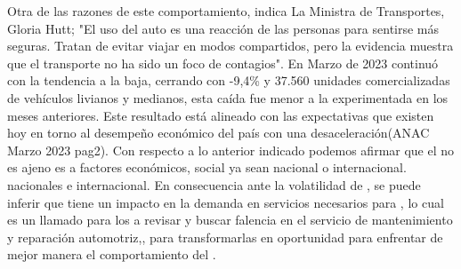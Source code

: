 \documentclass[a4papper,11pt]{article}
\begin{document}
      Otra de las razones de este comportamiento, indica La Ministra de Transportes, Gloria Hutt; "El uso del auto es una reacción de las personas para sentirse más seguras. Tratan de evitar viajar en modos compartidos, pero la evidencia muestra que el transporte no ha sido un foco de contagios".
      En Marzo de 2023 continuó con la tendencia a la baja, cerrando con -9,4\% y 37.560 unidades comercializadas de vehículos livianos y medianos, esta caída fue menor a la experimentada en los meses anteriores. Este resultado está alineado con las expectativas que existen hoy en torno al desempeño económico del país con una desaceleración(ANAC Marzo 2023 pag2).
     Con respecto a lo anterior indicado podemos afirmar que el \mlm no es ajeno es a factores económicos, social ya sean nacional o internacional. nacionales e internacional. En consecuencia ante la volatilidad  de \mlm, se puede inferir que tiene un impacto en la demanda en servicios necesarios para \mlm, lo cual es un llamado para los a revisar y buscar falencia en el servicio de mantenimiento y reparación automotriz,, para transformarlas en oportunidad para enfrentar de mejor manera el comportamiento del \mlm.
 
\end{document}
